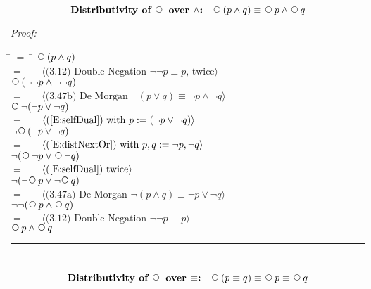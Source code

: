 \documentclass[fleqn, leqno]{article}
\newcommand{\lgap}{2pt}                             %
\newcommand{\mymathindent}{24pt}                    %
\newcommand{\Next}{\;\,\text{\raisebox{3.5pt}{\circle{6}}}}
\newcommand{\myqed}{\hfill\rule[-.23ex]{1.2ex}{2.0ex}}
\newcommand{\Gll} {\langle}                         %
\newcommand{\Ggg} {\rangle}                         %
\newcommand{\Hint}[1]     {\ \ \ $\Gll              \mbox{#1} \Ggg$ }   %
\begin{document}
\begin{equation}\label{E:distNextAnd}
\textbf{Distributivity of $\Next$ over $\land$:}\quad \Next (p \land q) \equiv \Next p \land \Next q
\end{equation}

\emph{Proof:}
\begin{tabbing}
\hspace{\mymathindent} \= $= \;$ \= \kill
  \> \>   $\Next (p \land q)$\\[\lgap]
  \> $=$  \>  \Hint{(3.12) Double Negation $\neg\neg p\equiv p$, twice}\\[\lgap]
  \> \>   $\Next (\neg\neg p \land \neg\neg q)$\\[\lgap]
  \> $=$  \>  \Hint{(3.47b) De Morgan $\neg (p \lor q) \equiv \neg p \land \neg q$}\\[\lgap]
  \> \>   $\Next\neg(\neg p \lor \neg q)$\\[\lgap]
  \> $=$  \>  \Hint{(\ref{E:selfDual}) with $p:= (\neg p \lor \neg q$)}\\[\lgap]
  \> \>   $\neg\Next (\neg p \lor \neg q)$\\[\lgap]
  \> $=$  \>  \Hint{(\ref{E:distNextOr}) with $p,q := \neg p, \neg q$}\\[\lgap]
  \> \>   $\neg (\Next\neg p \lor \Next \neg q)$\\[\lgap]
  \> $=$  \>  \Hint{(\ref{E:selfDual}) twice}\\[\lgap]
  \> \>   $\neg(\neg\Next p \lor \neg\Next q)$\\[\lgap]
  \> $=$  \>  \Hint{(3.47a) De Morgan $\neg (p \land q) \equiv \neg p \lor \neg q$}\\[\lgap]
  \> \>   $\neg\neg(\Next p \land \Next q)$\\[\lgap]
  \> $=$  \>  \Hint{(3.12) Double Negation $\neg\neg p\equiv p$}\\[\lgap]
  \> \>   $\Next p \land \Next q$
\end{tabbing}
\myqed\\[\lgap]

\begin{equation}\label{E:distNextEquiv}
\textbf{Distributivity of $\Next$ over $\equiv$:}\quad \Next (p \equiv q) \equiv \Next p \equiv \Next q
\end{equation}
\end{document}
